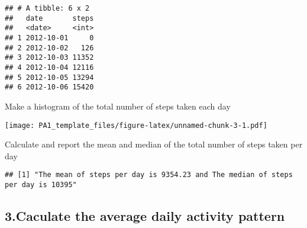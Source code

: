 \documentclass[]{article}
\newenvironment{Shaded}{\begin{snugshade}}{\end{snugshade}}
\newcommand{\AttributeTok}[1]{\textcolor[rgb]{0.77,0.63,0.00}{#1}}
\newcommand{\CommentTok}[1]{\textcolor[rgb]{0.56,0.35,0.01}{\textit{#1}}}
\newcommand{\DecValTok}[1]{\textcolor[rgb]{0.00,0.00,0.81}{#1}}
\newcommand{\FunctionTok}[1]{\textcolor[rgb]{0.00,0.00,0.00}{#1}}
\newcommand{\NormalTok}[1]{#1}
\newcommand{\OtherTok}[1]{\textcolor[rgb]{0.56,0.35,0.01}{#1}}
\newcommand{\SpecialCharTok}[1]{\textcolor[rgb]{0.00,0.00,0.00}{#1}}
\newcommand{\StringTok}[1]{\textcolor[rgb]{0.31,0.60,0.02}{#1}}
\begin{document}
\begin{verbatim}
## # A tibble: 6 x 2
##   date       steps
##   <date>     <int>
## 1 2012-10-01     0
## 2 2012-10-02   126
## 3 2012-10-03 11352
## 4 2012-10-04 12116
## 5 2012-10-05 13294
## 6 2012-10-06 15420
\end{verbatim}

Make a histogram of the total number of steps taken each day

\begin{Shaded}
\end{Shaded}

\texttt{[image: PA1\_template\_files/figure-latex/unnamed-chunk-3-1.pdf]}

Calculate and report the mean and median of the total number of steps
taken per day

\begin{Shaded}
\end{Shaded}

\begin{verbatim}
## [1] "The mean of steps per day is 9354.23 and The median of steps per day is 10395"
\end{verbatim}

\hypertarget{caculate-the-average-daily-activity-pattern}{%
\subsection{3.Caculate the average daily activity
pattern}\label{caculate-the-average-daily-activity-pattern}}
\end{document}
